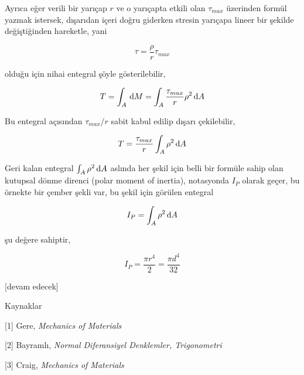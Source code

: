 \documentclass[12pt,fleqn]{article}\usepackage{../../common}
\begin{document}
Ayrıca eğer verili bir yarıçap $r$ ve o yarıçapta etkili olan $\tau_{max}$
üzerinden formül yazmak istersek, dışarıdan içeri doğru giderken stresin
yarıçapa lineer bir şekilde değiştiğinden hareketle, yani

$$
\tau = \frac{\rho}{r} \tau_{max}
$$

olduğu için nihai entegral şöyle gösterilebilir,

$$
T = \int_A \,\mathrm{d} M = \int_A \frac{\tau_{max}}{r} \rho^2 \,\mathrm{d} A
$$

Bu entegral açısından $\tau_{max} / r$ sabit kabul edilip dışarı çekilebilir,

$$
T = \frac{\tau_{max}}{r} \int_A \rho^2 \,\mathrm{d} A
$$

Geri kalan entegral $\int_A \rho^2 \,\mathrm{d} A$ aslında her şekil için belli bir
formüle sahip olan kutupsal dönme direnci (polar moment of inertia), notasyonda
$I_P$ olarak geçer, bu örnekte bir çember şekli var, bu şekil için görülen
entegral

$$
I_P = \int_A \rho^2 \,\mathrm{d} A
$$

şu değere sahiptir,

$$
I_P = \frac{\pi r^4}{2} = \frac{\pi d^4}{32}
$$


[devam edecek]

Kaynaklar

[1] Gere, {\em Mechanics of Materials}

[2] Bayramlı, {\em Normal Diferansiyel Denklemler, Trigonometri}

[3] Craig, {\em Mechanics of Materials}
\end{document}
